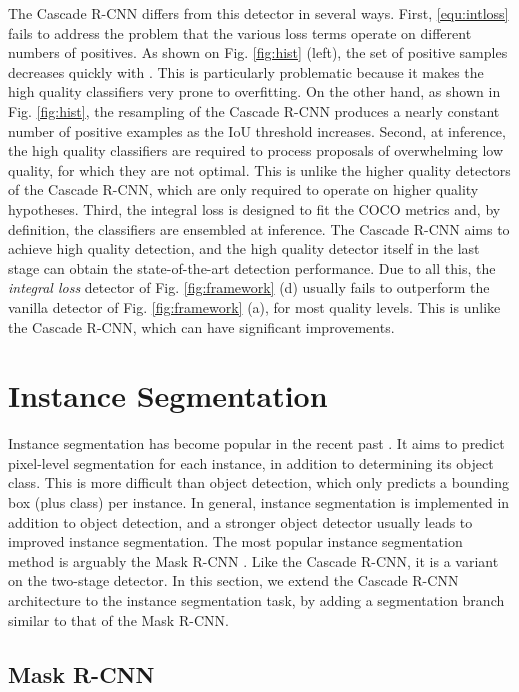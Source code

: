 \documentclass[10pt,journal,compsoc]{IEEEtran}
\begin{document}
The Cascade R-CNN differs from this detector in several ways. First,
\eqref{equ:intloss} fails to address the problem that
the various loss terms operate on different numbers of
positives. As shown on Fig. \ref{fig:hist} (left), the set of
positive samples decreases quickly with . This is particularly
problematic because it makes the high quality classifiers very prone to
overfitting. On the other hand, as shown in Fig. \ref{fig:hist}, the
resampling of the Cascade R-CNN produces a nearly constant number of positive
examples as the IoU threshold  increases.
Second, at inference, the high quality classifiers are required to process
proposals of overwhelming low quality, for which they are not
optimal. This is unlike the higher quality detectors of the Cascade R-CNN,
which are only required to operate on higher quality hypotheses.
Third, the integral loss is designed to fit the COCO metrics and,
by definition, the classifiers are ensembled at inference. The Cascade R-CNN
aims to achieve high quality detection, and the high quality detector itself
in the last stage can obtain the state-of-the-art detection
performance. Due to all this,
the \textit{integral loss} detector of Fig. \ref{fig:framework} (d) usually fails to
outperform the vanilla detector of
Fig. \ref{fig:framework} (a), for most quality levels. This is unlike the
Cascade R-CNN, which can have significant improvements.


\section{Instance Segmentation}
\label{sec:mask}

Instance segmentation has become popular in the recent
past \cite{DBLP:conf/cvpr/DaiHS16,he2017mask,liu2018path}. It aims to
predict pixel-level segmentation for each instance, in addition to determining
its object class. This is more difficult than object detection, which only
predicts a bounding box (plus class) per instance. In general, instance
segmentation is implemented in addition to object detection, and a stronger
object detector usually leads to improved instance segmentation.
The most popular instance segmentation method is arguably the
Mask R-CNN \cite{he2017mask}. Like the Cascade R-CNN, it is a variant
on the two-stage detector. In this section, we extend
the Cascade R-CNN architecture to the instance segmentation task, by
adding a segmentation branch similar to that of the Mask R-CNN.


\subsection{Mask R-CNN}
\end{document}
